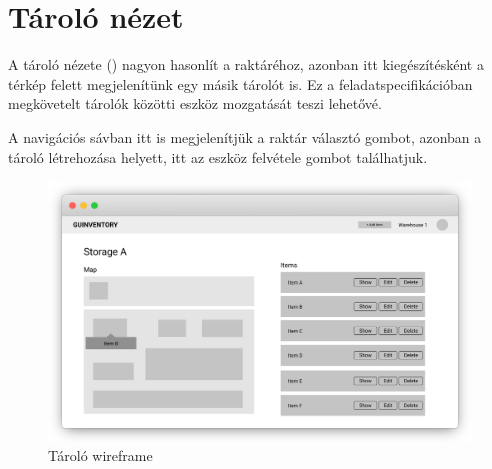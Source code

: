 \section{Tároló nézet}
A tároló nézete () nagyon hasonlít a raktáréhoz, azonban itt kiegészítésként a térkép felett megjelenítünk egy másik tárolót is.
Ez a feladatspecifikációban megkövetelt tárolók közötti eszköz mozgatását teszi lehetővé.

A navigációs sávban itt is megjelenítjük a raktár választó gombot, azonban a tároló létrehozása helyett, itt az eszköz felvétele gombot találhatjuk.

\begin{figure}[!ht]
  \centering
  \includegraphics[width=150mm, keepaspectratio]{figures/wireframes/frame_storage.png}
  \caption{Tároló wireframe}
  \label{fig:StorageWireframe}
\end{figure}
  